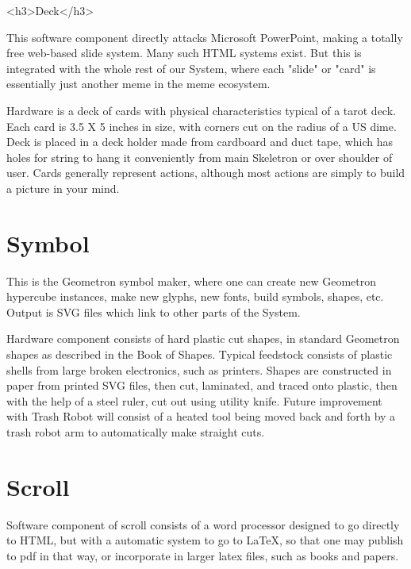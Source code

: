 \documentclass[11pt]{article}
\begin{document}
<h3>Deck</h3>



    This software component directly attacks Microsoft PowerPoint, making a totally free web-based slide system.  Many such HTML systems exist.  But this is integrated with the whole rest of our System, where each "slide" or "card" is essentially just another meme in the meme ecosystem.




    Hardware is a deck of cards with physical characteristics typical of a tarot deck.  Each card is 3.5 X 5 inches in size, with corners cut on the radius of a US dime.  Deck is placed in a  deck holder made from cardboard and duct tape, which has holes for string to hang it conveniently from main Skeletron or over shoulder of user.  Cards generally represent actions, although most actions are simply to build a picture in your mind.  



\section{
Symbol}



    This is the Geometron symbol maker, where one can create new Geometron hypercube instances, make new glyphs, new fonts, build symbols, shapes, etc. Output is SVG files which link to other parts of the System.




    Hardware component consists of hard plastic cut shapes, in standard Geometron shapes as described in the Book of Shapes.  Typical feedstock consists of plastic shells from large broken electronics, such as printers.  Shapes are constructed in paper from printed SVG files, then cut, laminated, and traced onto plastic, then with the help of a steel ruler, cut out using utility knife.  Future improvement with Trash Robot will consist of a heated tool being moved back and forth by a trash robot arm to automatically make straight cuts.  


\section{
Scroll}



    Software component of scroll consists of a word processor designed to go directly to HTML, but with a automatic system to go to LaTeX, so that one may publish to pdf in that way, or incorporate in larger latex files, such as books and papers.
\end{document}
